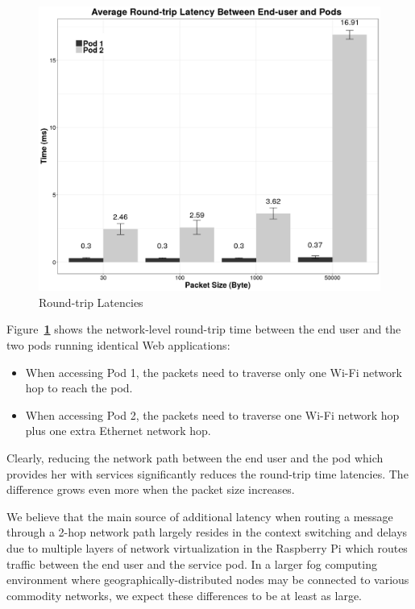 \documentclass[letterpaper,twocolumn,10pt]{article}
\let\origref\ref
\def\ref#1{\textbf{\origref{#1}}}
\begin{document}
\begin{figure}[tbp]
  \centering
  \includegraphics[width=.9\linewidth]{images/graph.png}
  \caption{Round-trip Latencies}
  \label{fig:lat}
\end{figure}

Figure~\ref{fig:lat} shows the network-level round-trip time between
the end user and the two pods running identical Web applications:

\begin{itemize}
\item When accessing Pod 1, the packets need to traverse only one Wi-Fi
  network hop to reach the pod.
\item When accessing Pod 2, the packets need to traverse one Wi-Fi
  network hop plus one extra Ethernet network hop.
\end{itemize}

Clearly, reducing the network path between the end user and the pod
which provides her with services significantly reduces the round-trip
time latencies. The difference grows even more when the packet size
increases. 

We believe that the main source of additional latency when routing a
message through a 2-hop network path largely resides in the context
switching and delays due to multiple layers of network virtualization
in the Raspberry Pi which routes traffic between the end user and the
service pod. In a larger fog computing environment where
geographically-distributed nodes may be connected to various commodity
networks, we expect these differences to be at least as large.
\end{document}
